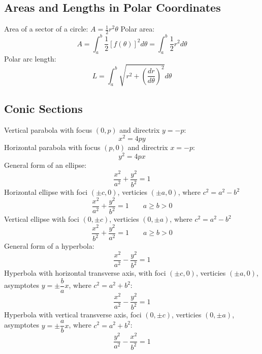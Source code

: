 \documentclass{article}
\begin{document}
    \subsection{Areas and Lengths in Polar Coordinates}
    \begin{outline}
        \1 Area of a sector of a circle: \(A=\frac{1}{2}r^2\theta\)
        \1 Polar area: \[A=\int^b_a\frac{1}{2}[f(\theta)]^2d\theta=\int^b_a\frac{1}{2}r^2d\theta\]
        \1 Polar arc length: \[L=\int^b_a\sqrt{r^2+\left(\dfrac{dr}{d\theta}\right)^2}d\theta\]
    \end{outline}
    \subsection{Conic Sections}
    \begin{outline}
        \1 Vertical parabola with focus \((0,p)\) and directrix \(y=-p\): \[x^2=4py\]
        \1 Horizontal parabola with focus \((p,0)\) and directrix \(x=-p\): \[y^2=4px\]
        \1 General form of an ellipse: \[\dfrac{x^2}{a^2}+\dfrac{y^2}{b^2}=1\]
        \1 Horizontal ellipse with foci \((\pm c,0)\), verticies \((\pm a,0)\), where \(c^2=a^2-b^2\) \[\dfrac{x^2}{a^2}+\dfrac{y^2}{b^2}=1\qquad a\geq b>0\]
        \1 Vertical ellipse with foci \((0,\pm c)\), verticies \((0,\pm a)\), where \(c^2=a^2-b^2\) \[\dfrac{x^2}{b^2}+\dfrac{y^2}{a^2}=1\qquad a\geq b>0\]
        \1 General form of a hyperbola: \[\dfrac{x^2}{a^2}-\dfrac{y^2}{b^2}=1\]
        \1 Hyperbola with horizontal transverse axis, with foci \((\pm c,0)\), verticies \((\pm a,0)\), asymptotes \(y=\pm\dfrac{b}{a}x\), where \(c^2=a^2+b^2\): \[\dfrac{x^2}{a^2}-\dfrac{y^2}{b^2}=1\]
        \1 Hyperbola with vertical transverse axis, foci \((0,\pm c)\), verticies \((0,\pm a)\), asymptotes \(y=\pm\dfrac{a}{b}x\), where \(c^2=a^2+b^2\): \[\dfrac{y^2}{a^2}-\dfrac{x^2}{b^2}=1\]

    \end{outline}
\end{document}

